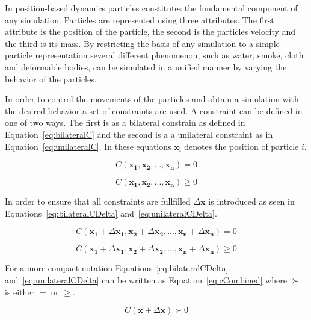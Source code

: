 In position-based dynamics particles constitutes the fundamental component of
any simulation.  Particles are represented using three attributes. The first
attribute is the position of the particle, the second is the particles velocity
and the third is its mass. By restricting the basis of any simulation to a
simple particle representation several different phenomenon, such as water,
smoke, cloth and deformable bodies, can be simulated in a unified manner by
varying the behavior of the particles.

In order to control the movements of the particles and obtain a simulation with
the desired behavior a set of constraints are used. A constraint can be defined
in one of two ways. The first is as a bilateral constrain as defined in
Equation~\ref{eq:bilateralC} and the second is a a unilateral constraint as in
Equation~\ref{eq:unilateralC}. In these equations $ \mathbf{x_{i}} $ denotes
the position of particle $ i $.

\begin{equation}
\label{eq:bilateralC}
C(\mathbf{x_{1}}, \mathbf{x_{2}}, ..., \mathbf{x_{n}}) = 0
\end{equation}

\begin{equation}
\label{eq:unilateralC}
C(\mathbf{x_{1}}, \mathbf{x_{2}}, ..., \mathbf{x_{n}}) \geq 0
\end{equation}

In order to ensure that all constraints are fullfilled $ \Delta \mathbf{x} $ is
introduced as seen in Equations~\ref{eq:bilateralCDelta} and~\ref{eq:unilateralCDelta}.

\begin{equation}
\label{eq:bilateralCDelta}
C(\mathbf{x_{1}} + \Delta \mathbf{x_{1}}, \mathbf{x_{2}} + \Delta \mathbf{x_{2}}, ..., \mathbf{x_{n}} + \Delta \mathbf{x_{n}}) = 0
\end{equation}

\begin{equation}
\label{eq:unilateralCDelta}
C(\mathbf{x_{1}} + \Delta \mathbf{x_{1}}, \mathbf{x_{2}} + \Delta \mathbf{x_{2}}, ..., \mathbf{x_{n}} + \Delta \mathbf{x_{n}}) \geq 0
\end{equation}

For a more compact notation Equations~\ref{eq:bilateralCDelta}
and~\ref{eq:unilateralCDelta} can be written as Equation~\ref{eq:cCombined}
where $ \succ $ is either $ = $ or $ \geq $.

\begin{equation}
\label{eq:cCombined}
C(\mathbf{x} + \Delta \mathbf{x}) \succ 0
\end{equation}

